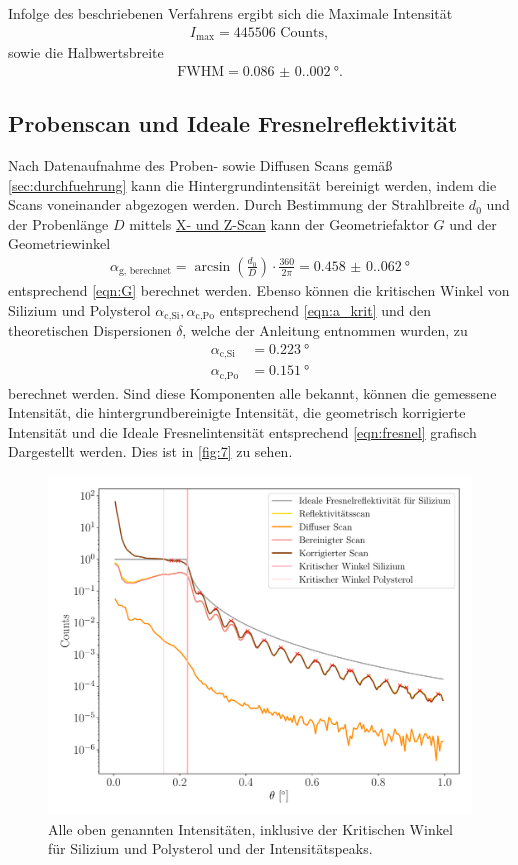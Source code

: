 \documentclass[12pt]{article}
\begin{document}
Infolge des beschriebenen Verfahrens ergibt sich die Maximale Intensität 
\begin{align*}
  I_{\text{max}} = 445506\text{ Counts},
\end{align*}
sowie die Halbwertsbreite
\begin{align*}
  \text{FWHM} = \SI{0.086(0.002)}{\degree}\text{.}
\end{align*}
\subsection{Probenscan und Ideale Fresnelreflektivität}
Nach Datenaufnahme des Proben- sowie Diffusen Scans gemäß \autoref{sec:durchfuehrung} kann die Hintergrundintensität bereinigt werden, indem die Scans voneinander abgezogen werden.
Durch Bestimmung der Strahlbreite $d_0$ und der Probenlänge $D$ mittels \hyperref[sec:durchfuehrung]{X- und Z-Scan} kann der Geometriefaktor $G$
und der Geometriewinkel
\begin{align*}
  \alpha_\text{g, berechnet}=\arcsin\left(\frac{d_0}{D}\right) \cdot \frac{360}{2 \pi}=\SI{0.458(0.062)}{\degree}
\end{align*}
entsprechend \autoref{eqn:G} berechnet werden.
Ebenso können die kritischen Winkel von Silizium und Polysterol $\alpha_\text{c,Si}, \alpha_\text{c,Po}$ entsprechend \autoref{eqn:a_krit} und den theoretischen Dispersionen $\delta$, welche der Anleitung entnommen wurden, zu
\begin{align*}
  \alpha_\text{c,Si}&=\SI{0.223}{\degree}\\
  \alpha_\text{c,Po}&=\SI{0.151}{\degree}
\end{align*}
berechnet werden.
Sind diese Komponenten alle bekannt, können die gemessene Intensität, die hintergrundbereinigte Intensität, die geometrisch korrigierte Intensität und die Ideale Fresnelintensität entsprechend \autoref{eqn:fresnel} grafisch Dargestellt werden.
Dies ist in \autoref{fig:7} zu sehen.
\begin{figure}[H]
  \centering
  \includegraphics[scale=0.6]{Ressourcen/probe.pdf}
  \caption{Alle oben genannten Intensitäten, inklusive der Kritischen Winkel für Silizium und Polysterol und der Intensitätspeaks.}\label{fig:7}
\end{figure}
\end{document}
